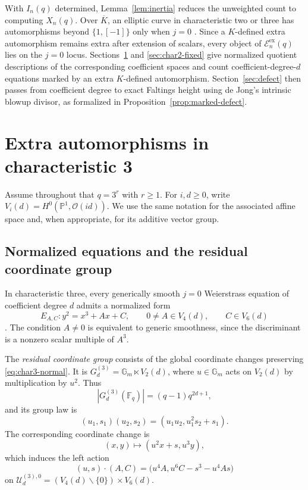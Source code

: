 \documentclass[a4paper,12pt]{amsart}
\theoremstyle{definition}
\newcommand{\cU}{\mathcal{U}}
\newcommand{\Fb}{\mathbb{F}}
\newcommand{\cE}{\mathcal E}
\newcommand{\Pb}{\mathbb{P}}
\newcommand{\Gb}{\mathbb{G}}
\renewcommand{\setminus}{\smallsetminus}
\begin{document}
With $I_n(q)$ determined, Lemma~\ref{lem:inertia} reduces the unweighted count to computing $X_n(q)$.  Over $\overline K$, an elliptic curve in characteristic two or three has automorphisms beyond $\{1,[-1]\}$ only when $j=0$ \cite[Appendix~A, Proposition~1.2(c)]{Silverman}.  Since a $K$-defined extra automorphism remains extra after extension of scalars, every object of $\cE_n^{\mathrm{ex}}(q)$ lies on the $j=0$ locus.  Sections~\ref{sec:char3-fixed} and \ref{sec:char2-fixed} give normalized quotient descriptions of the corresponding coefficient spaces and count coefficient-degree-$d$ equations marked by an extra $K$-defined automorphism.  Section~\ref{sec:defect} then passes from coefficient degree to exact Faltings height using de Jong's intrinsic blowup divisor, as formalized in Proposition~\ref{prop:marked-defect}.


\section{Extra automorphisms in characteristic 3}
\label{sec:char3-fixed}

Assume throughout that $q=3^r$ with $r\geq1$.  For $i,d\geq0$, write $V_i(d)=H^0(\Pb^1,\mathcal O(id))$.  We use the same notation for the associated affine space and, when appropriate, for its additive vector group.

\subsection{Normalized equations and the residual coordinate group}

In characteristic three, every generically smooth $j=0$ Weierstrass equation of coefficient degree $d$ admits a normalized form
\begin{equation}\label{eq:char3-normal}
E_{A,C}\colon y^2=x^3+Ax+C,
\qquad
0\neq A\in V_4(d),
\qquad
C\in V_6(d)
\end{equation}
\cite[Section~4.13(b2)]{dJ2}.  The condition $A\neq0$ is equivalent to generic smoothness, since the discriminant is a nonzero scalar multiple of $A^3$.

The \emph{residual coordinate group} consists of the global coordinate changes preserving \eqref{eq:char3-normal}.  It is $G_d^{(3)}=\Gb_m\ltimes V_2(d)$, where $u\in\Gb_m$ acts on $V_2(d)$ by multiplication by $u^2$.  Thus
\begin{equation}\label{eq:char3-group-size}
|G_d^{(3)}(\Fb_q)|=(q-1)q^{2d+1},
\end{equation}
and its group law is
\begin{equation}\label{eq:char3-group-law}
(u_1,s_1)(u_2,s_2)
=
(u_1u_2,u_1^2s_2+s_1).
\end{equation}
The corresponding coordinate change is
\begin{equation}\label{eq:char3-change}
(x,y)\longmapsto(u^2x+s,u^3y),
\end{equation}
which induces the left action
\begin{equation}\label{eq:char3-action}
(u,s)\cdot(A,C)
=
\bigl(u^4A,u^6C-s^3-u^4As\bigr)
\end{equation}
on
$\cU_d^{(3),0}=(V_4(d)\setminus\{0\})\times V_6(d)$.
\end{document}
